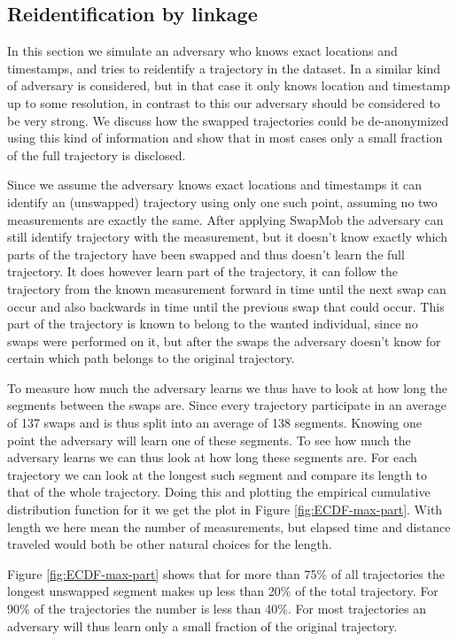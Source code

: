 \documentclass{llncs}
\begin{document}
\subsection{Reidentification by linkage}
\label{sec:reidentification}
In this section we simulate an adversary who knows exact locations and
timestamps, and tries to reidentify a trajectory in the dataset. In
\cite{demontjoye2013} a similar kind of adversary is considered, but
in that case it only knows location and timestamp up to some
resolution, in contrast to this our adversary should be considered to
be very strong. We discuss how the swapped trajectories could be
de-anonymized using this kind of information and show that in most
cases only a small fraction of the full trajectory is disclosed.

Since we assume the adversary knows exact locations and timestamps it
can identify an (unswapped) trajectory using only one such point,
assuming no two measurements are exactly the same. After applying
SwapMob the adversary can still identify trajectory with the
measurement, but it doesn't know exactly which parts of the trajectory
have been swapped and thus doesn't learn the full trajectory. It does
however learn part of the trajectory, it can follow the trajectory
from the known measurement forward in time until the next swap can
occur and also backwards in time until the previous swap that could
occur. This part of the trajectory is known to belong to the wanted
individual, since no swaps were performed on it, but after the swaps
the adversary doesn't know for certain which path belongs to the
original trajectory.

To measure how much the adversary learns we thus have to look at how
long the segments between the swaps are. Since every trajectory
participate in an average of 137 swaps and is thus split into an
average of 138 segments. Knowing one point the adversary will learn
one of these segments. To see how much the adversary learns we can
thus look at how long these segments are. For each trajectory we can
look at the longest such segment and compare its length to that of the
whole trajectory. Doing this and plotting the empirical cumulative
distribution function for it we get the plot in Figure
\ref{fig:ECDF-max-part}. With length we here mean the number of
measurements, but elapsed time and distance traveled would both be
other natural choices for the length.

Figure \ref{fig:ECDF-max-part} shows that for more than 75\% of all
trajectories the longest unswapped segment makes up less than 20\% of
the total trajectory. For 90\% of the trajectories the number is less
than 40\%. For most trajectories an adversary will thus learn only a
small fraction of the original trajectory.
\end{document}
